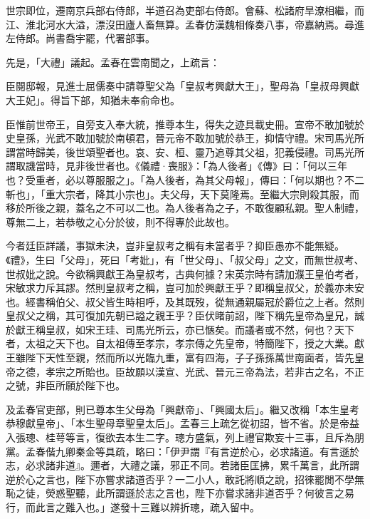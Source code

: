 \begin{pinyinscope}
世宗即位，遷南京兵部右侍郎，半道召為吏部右侍郎。會蘇、松諸府旱潦相繼，而江、淮北河水大溢，漂沒田廬人畜無算。孟春仿漢魏相條奏八事，帝嘉納焉。尋進左侍郎。尚書喬宇罷，代署部事。

先是，「大禮」議起。孟春在雲南聞之，上疏言：

臣閱邸報，見進士屈儒奏中請尊聖父為「皇叔考興獻大王」，聖母為「皇叔母興獻大王妃」。得旨下部，知猶未奉俞命也。

臣惟前世帝王，自旁支入奉大統，推尊本生，得失之迹具載史冊。宣帝不敢加號於史皇孫，光武不敢加號於南頓君，晉元帝不敢加號於恭王，抑情守禮。宋司馬光所謂當時歸美，後世頌聖者也。哀、安、桓、靈乃追尊其父祖，犯義侵禮。司馬光所謂取譏當時，見非後世者也。《儀禮·喪服》：「為人後者」《傳》曰：「何以三年也？受重者，必以尊服服之」。「為人後者，為其父母報」，傳曰：「何以期也？不二斬也」，「重大宗者，降其小宗也」。夫父母，天下莫隆焉。至繼大宗則殺其服，而移於所後之親，蓋名之不可以二也。為人後者為之子，不敢復顧私親。聖人制禮，尊無二上，若恭敬之心分於彼，則不得專於此故也。

今者廷臣詳議，事獄未決，豈非皇叔考之稱有未當者乎？抑臣愚亦不能無疑。《禮》，生曰「父母」，死曰「考妣」，有「世父母」、「叔父母」之文，而無世叔考、世叔妣之說。今欲稱興獻王為皇叔考，古典何據？宋英宗時有請加濮王皇伯考者，宋敏求力斥其謬。然則皇叔考之稱，豈可加於興獻王乎？即稱皇叔父，於義亦未安也。經書稱伯父、叔父皆生時相呼，及其既歿，從無通親屬冠於爵位之上者。然則皇叔父之稱，其可復加先朝已謚之親王乎？臣伏睹前詔，陛下稱先皇帝為皇兄，誠於獻王稱皇叔，如宋王珪、司馬光所云，亦已愜矣。而議者或不然，何也？天下者，太祖之天下也。自太祖傳至孝宗，孝宗傳之先皇帝，特簡陛下，授之大業。獻王雖陛下天性至親，然而所以光臨九重，富有四海，子子孫孫萬世南面者，皆先皇帝之德，孝宗之所貽也。臣故願以漢宣、光武、晉元三帝為法，若非古之名，不正之號，非臣所願於陛下也。

及孟春官吏部，則已尊本生父母為「興獻帝」、「興國太后」。繼又改稱「本生皇考恭穆獻皇帝」、「本生聖母章聖皇太后」。孟春三上疏乞從初詔，皆不省。於是帝益入張璁、桂萼等言，復欲去本生二字。璁方盛氣，列上禮官欺妄十三事，且斥為朋黨。孟春偕九卿秦金等具疏，略曰：「伊尹謂『有言逆於心，必求諸道。有言遜於志，必求諸非道』。邇者，大禮之議，邪正不同。若諸臣匡拂，累千萬言，此所謂逆於心之言也，陛下亦嘗求諸道否乎？一二小人，敢託將順之說，招徠罷閒不學無恥之徒，熒惑聖聽，此所謂遜於志之言也，陛下亦嘗求諸非道否乎？何彼言之易行，而此言之難入也。」遂發十三難以辨折璁，疏入留中。


\end{pinyinscope}
